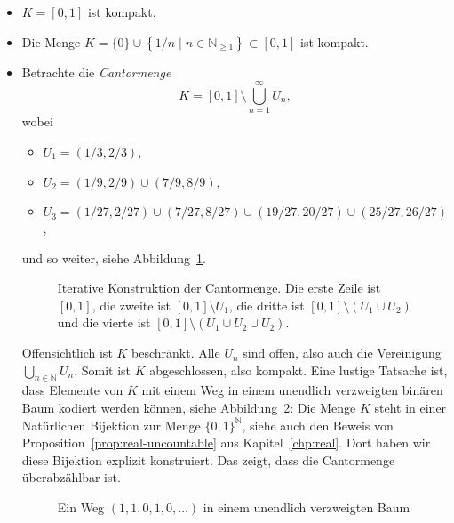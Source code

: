 \documentclass[../main.tex]{subfiles}
\begin{document}
\begin{examples}
  \leavevmode
  \begin{itemize}
    \item $K = [0, 1]$ ist kompakt.
    \item Die Menge
      $
        K = \{0\} \cup \left\{1/n \mid n \in \mathbb{N}_{\geq 1}\right\} 
        \subset [0, 1]
      $
      ist kompakt.
    \item 
      Betrachte die \emph{Cantormenge}
      \[
        K = [0, 1] \setminus \bigcup_{n=1}^{\infty} U_n,
      \]
      wobei
      \begin{itemize}
        \item $U_1 = (1/3, 2/3)$,
        \item $U_2 = (1/9, 2/9) \cup (7/9, 8/9)$,
        \item $U_3 = (1/27, 2/27) \cup (7/27, 8/27) \cup (19/27, 20/27) \cup (25/27, 26/27)$,
      \end{itemize}
      und so weiter,
      siehe Abbildung~\ref{fig:cantor}.

      \begin{figure}[htb]
        \centering
        
        \caption{Iterative Konstruktion der
        Cantormenge. Die erste Zeile ist
        $[0, 1]$, die zweite ist
        $[0, 1] \setminus U_1$, die dritte ist
        $[0, 1] \setminus (U_1 \cup U_2)$ und die
        vierte ist $[0, 1] \setminus (U_1 \cup U_2 \cup U_2)$.}%
        \label{fig:cantor}
      \end{figure}

      Offensichtlich ist $K$ beschränkt.
      Alle $U_n$ sind offen, also auch
      die Vereinigung $\bigcup_{n \in \mathbb{N}} U_n$.
      Somit ist $K$ abgeschlossen, also kompakt.
      Eine lustige Tatsache ist,
      dass Elemente von $K$ mit einem Weg
      in einem unendlich
      verzweigten binären Baum kodiert werden können,
      siehe Abbildung~\ref{fig:tree}:
      Die Menge $K$ steht in einer Natürlichen
      Bijektion zur Menge ${\{0, 1\}}^{\mathbb{N}}$,
      siehe auch den Beweis von 
      Proposition~\ref{prop:real-uncountable}
      aus Kapitel~\ref{chp:real}.
      Dort haben wir diese Bijektion explizit konstruiert.
      Das zeigt, dass die Cantormenge überabzählbar ist.

      \begin{figure}[htb]
        \centering
        
        \caption{Ein Weg $(1,1,0,1,0, \dots)$ in einem unendlich
        verzweigten Baum}%
        \label{fig:tree}
      \end{figure}
  \end{itemize}
\end{examples}
\end{document}
